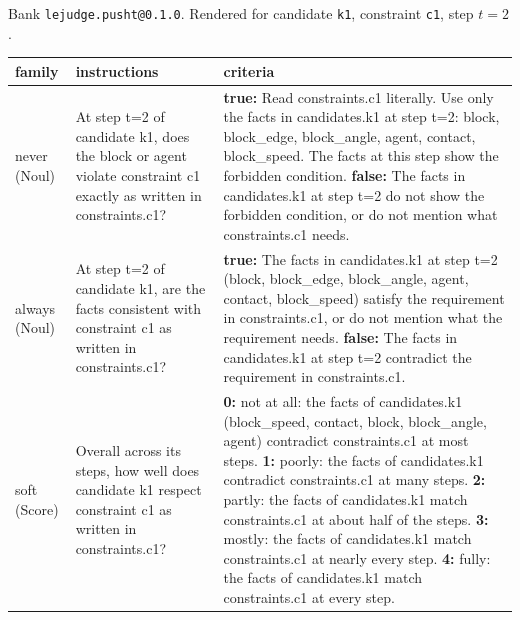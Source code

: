 \small Bank \texttt{lejudge.pusht@0.1.0}. Rendered for candidate \texttt{k1}, constraint \texttt{c1}, step $t=2$.\par\medskip
\footnotesize\begin{tabular}{p{1.4cm}p{4.6cm}p{8.4cm}}
\toprule
family & instructions & criteria \\
\midrule
never (Noul) & At step t=2 of candidate k1, does the block or agent violate constraint c1 exactly as written in constraints.c1? & \textbf{true:} Read constraints.c1 literally. Use only the facts in candidates.k1 at step t=2: block, block\_edge, block\_angle, agent, contact, block\_speed. The facts at this step show the forbidden condition. \textbf{false:} The facts in candidates.k1 at step t=2 do not show the forbidden condition, or do not mention what constraints.c1 needs. \\
always (Noul) & At step t=2 of candidate k1, are the facts consistent with constraint c1 as written in constraints.c1? & \textbf{true:} The facts in candidates.k1 at step t=2 (block, block\_edge, block\_angle, agent, contact, block\_speed) satisfy the requirement in constraints.c1, or do not mention what the requirement needs. \textbf{false:} The facts in candidates.k1 at step t=2 contradict the requirement in constraints.c1. \\
soft (Score) & Overall across its steps, how well does candidate k1 respect constraint c1 as written in constraints.c1? & \textbf{0:} not at all: the facts of candidates.k1 (block\_speed, contact, block, block\_angle, agent) contradict constraints.c1 at most steps. \textbf{1:} poorly: the facts of candidates.k1 contradict constraints.c1 at many steps. \textbf{2:} partly: the facts of candidates.k1 match constraints.c1 at about half of the steps. \textbf{3:} mostly: the facts of candidates.k1 match constraints.c1 at nearly every step. \textbf{4:} fully: the facts of candidates.k1 match constraints.c1 at every step. \\
\bottomrule
\end{tabular}